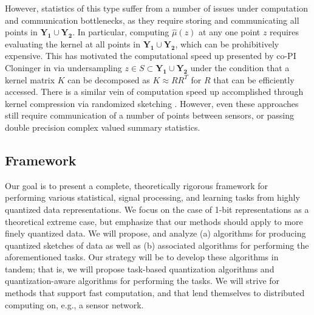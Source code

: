 However, statistics of this type suffer from a number of issues under computation and communication bottlenecks, as they require storing and communicating all points in $\mathbf{Y_1}\cup \mathbf{Y_2}$.  In particular, computing $\hat{\mu}(z)$ at any one point $z$ requires evaluating the kernel at all points in $\mathbf{Y_1}\cup \mathbf{Y_2}$, which can be prohibitively expensive.
This has motivated the computational speed up presented by co-PI Cloninger in \cite{cheng2017two} via undersampling $z\in S\subset \mathbf{Y_1}\cup \mathbf{Y_2}$ under the condition that a kernel matrix $K$ can be decomposed as $K\approx RR^T$ for $R$ that can be efficiently accessed.  There is a similar vein of computation speed up accomplished through kernel compression via randomized sketching \cite{gribonval2017compressive}.  However, even these approaches still require communication of a number of points between sensors, or passing double precision complex valued summary statistics.  







\subsection{Framework}%
 Our goal  is to present a complete, theoretically rigorous framework for performing various statistical, signal processing, and learning tasks from highly quantized data representations. We focus on the case of 1-bit representations as a theoretical extreme case, but emphasize that our methods should apply to more finely quantized data. We will propose, and analyze  (a) algorithms for  producing quantized sketches of data as well as (b) associated algorithms for performing the aforementioned tasks. Our strategy will be to develop these algorithms in tandem; that is, we will propose task-based quantization algorithms and quantization-aware algorithms for performing the tasks. We will strive for methods that support fast computation, and that lend themselves to distributed computing on, e.g., a sensor network.
  
